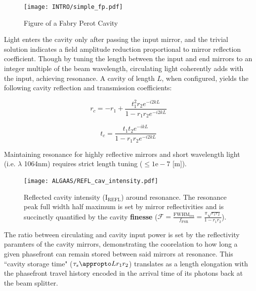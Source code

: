 \begin{figure}[h!]
	\centering
	\texttt{[image: INTRO/simple\_fp.pdf]}
	\caption{Figure of a Fabry Perot Cavity}
	\label{fig:fpcav}
\end{figure}

Light enters the cavity only after passing the input mirror, and the trivial solution indicates a field amplitude reduction proportional to mirror reflection coefficient. Though by tuning the length between the input and end mirrors to an integer multiple of the beam wavelength, circulating light coherently adds with the input, achieving resonance.  A cavity of length $L$, when configured, yields the following cavity reflection and transmission coefficients: 

\begin{equation}
	r_c = -r_1 + \frac{t^2_1r_2 e^{-i2kL}}{1-r_1 r_2 e^{-i2kL}}
\end{equation}

\begin{equation}
	t_c = \frac{t_1 t_2 e^{-ikL}}{1-r_1 r_2 e^{-i2kL}}	
\end{equation}

Maintaining resonance for highly reflective mirrors and short wavelength light (i.e. $\lambda$ 1064nm) requires strict length tuning ($\leq 1\mathrm{e-}7$ [m]). 

\begin{figure}[H]
\texttt{[image: ALGAAS/REFL\_cav\_intensity.pdf]}
\caption{Reflected cavity intensity (I$_\mathrm{REFL}$) around resonance. The resonance peak full width half maximum is set by mirror reflectivities and is succinctly quantified by the cavity \textbf{finesse} ($\mathscr{F} = \frac{\mathrm{FWHM}_\mathrm{res}}{f_\mathrm{FSR}} = \frac{\pi \sqrt{r_1 r_2}}{1-r_1 r_2}$).}
\label{fig:cav_length_response_DCpow}
\end{figure}

The ratio between circulating and cavity input power is set by the reflectivity paramters of the cavity mirrors, demonstrating the coorelation to how long a given phasefront can remain stored between said mirrors at resonance. This ``cavity storage time" ($\tau_s \appropto L r_1 r_2$) translates as a length elongation with the phasefront travel history encoded in the arrival time of its photons back at the beam splitter.

